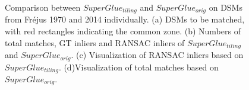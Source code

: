 \begin{figure}[htbp]
\begin{center}
{		}
		\caption{Comparison between $SuperGlue_{tiling}$ and $SuperGlue_{orig}$ on DSMs from Fr{\'e}jus 1970 and 2014 individually. (a) DSMs to be matched, with red rectangles indicating the common zone. (b) Numbers of total matches, GT inliers and RANSAC inliers of $SuperGlue_{tiling}$ and $SuperGlue_{orig}$. (c) Visualization of RANSAC inliers based on $SuperGlue_{tiling}$. (d)Visualization of total matches based on $SuperGlue_{orig}$.}
		\label{MatchDSM}
	\end{center}
\end{figure} 



